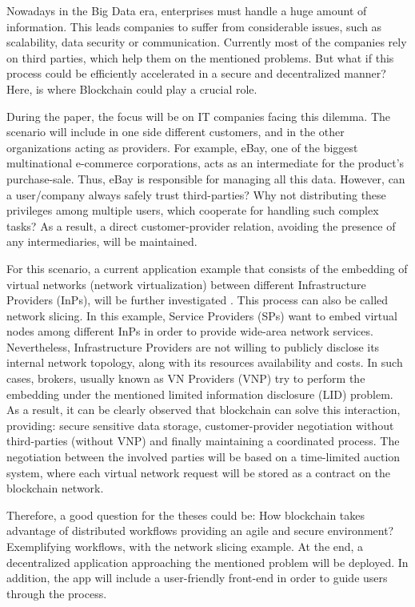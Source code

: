 Nowadays in the Big Data era, enterprises must handle a huge amount of information. This leads companies to suffer from considerable issues, such as scalability, data security or communication. Currently most of the companies rely on third parties, which help them on the mentioned problems. But what if this process could be efficiently accelerated in a secure and decentralized manner? Here, is where Blockchain could play a crucial role.

During the paper, the focus will be on IT companies facing this dilemma. The scenario will include in one side different customers, and in the other organizations acting as providers. For example, eBay, one of the biggest multinational e-commerce corporations, acts as an intermediate for the product's purchase-sale. Thus, eBay is responsible for managing all this data. However, can a user/company always safely trust third-parties? Why not distributing these privileges among multiple users, which cooperate for handling such complex tasks? As a result, a direct customer-provider relation, avoiding the presence of any intermediaries, will be maintained.

For this scenario, a current application example that consists of the embedding of virtual networks (network virtualization) between different Infrastructure Providers (InPs), will be further investigated \cite{dietrich2015multi}. This process can also be called network slicing. In this example, Service Providers (SPs) want to embed virtual nodes among different InPs in order to provide wide-area network services. Nevertheless, Infrastructure Providers are not willing to publicly disclose its internal network topology, along with its resources availability and costs. In such cases, brokers, usually known as VN Providers (VNP) try to perform the embedding under the mentioned limited information disclosure (LID) problem. As a result, it can be clearly observed that blockchain can solve this interaction, providing: secure sensitive data storage, customer-provider negotiation without third-parties (without VNP) and finally maintaining a coordinated process. The negotiation between the involved parties will be based on a time-limited auction system, where each virtual network request will be stored as a contract on the blockchain network.

Therefore, a good question for the theses could be: How blockchain takes advantage of distributed workflows providing an agile and secure environment? Exemplifying workflows, with the network slicing example. At the end, a decentralized application approaching the mentioned problem will be deployed. In addition, the app will include a user-friendly front-end in order to guide users through the process. 

